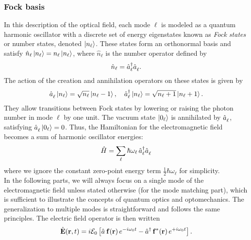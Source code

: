\subsubsection{Fock basis}
In this description of the optical field, each mode $\ell$ is modeled as a quantum harmonic oscillator with a discrete set of energy eigenstates known as \textit{Fock states} or number states, denoted $\ket{n_\ell}$. These states form an orthonormal basis and satisfy $\hat{n}_{\ell} \ket{n_\ell} = n_\ell \ket{n_\ell}$, where $\hat{n}_{\ell}$ is the number operator defined by
\[
\hat{n}_{\ell} = \hat{a}_{\ell}^\dagger \hat{a}^{\vphantom{\dagger}}_{\ell}.
\]
The action of the creation and annihilation operators on these states is given by
\[
\hat{a}^{\vphantom{\dagger}}_{\ell} \ket{n_\ell} = \sqrt{n_\ell} \ket{n_\ell - 1}, \quad
\hat{a}_{\ell}^\dagger \ket{n_\ell} = \sqrt{n_\ell + 1} \ket{n_\ell + 1}.
\]
They allow transitions between Fock states by lowering or raising the photon number in mode $\ell$ by one unit. The vacuum state $\ket{0_\ell}$ is annihilated by $\hat{a}^{\vphantom{\dagger}}_{\ell}$, satisfying $\hat{a}^{\vphantom{\dagger}}_{\ell} \ket{0_\ell} = 0$. Thus, the Hamiltonian for the electromagnetic field becomes a sum of harmonic oscillator energies:
\begin{equation}
\hat{H} = \sum_\ell \hbar \omega_{\ell} \, \hat{a}_{\ell}^\dagger \hat{a}^{\vphantom{\dagger}}_{\ell} 
\end{equation}
where we ignore the constant zero-point energy term $\frac{1}{2} \hbar \omega_{\ell}$ for simplicity. \\

In the following parts, we will always focus on a single mode of the electromagnetic field unless stated otherwise (for the mode matching part), which is sufficient to illustrate the concepts of quantum optics and optomechanics. The generalization to multiple modes is straightforward and follows the same principles. The electric field operator is then written
\begin{equation}
\hat{\mathbf{E}}(\mathbf{r}, t)
= i \mathcal{E}_0
\left[ \hat{a}^{\vphantom{\dagger}}\,\mathbf{f}(\mathbf{r})\,e^{-i\omega_0 t}
- \hat{a}^\dagger\,\mathbf{f}^*(\mathbf{r})\,e^{+i\omega_0 t} \right].
\end{equation}


